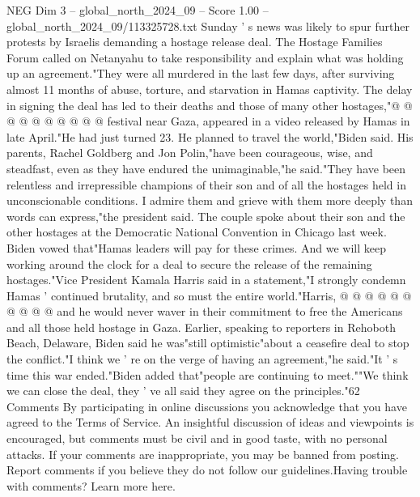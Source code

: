 \begin{textsample}{NEG Dim 3 – global\_north\_2024\_09 – Score 1.00 – global\_north\_2024\_09/113325728.txt}
Sunday ' s news was likely to spur further protests by Israelis demanding a hostage release deal.
The Hostage Families Forum called on Netanyahu to take responsibility and explain what was holding up an agreement."They were all murdered in the last few days, after surviving almost 11 months of abuse, torture, and starvation in Hamas captivity.
The delay in signing the deal has led to their deaths and those of many other hostages,"@ @ @ @ @ @ @ @ @ @ festival near Gaza, appeared in a video released by Hamas in late April."He had just turned 23.
He planned to travel the world,"Biden said.
His parents, Rachel Goldberg and Jon Polin,"have been courageous, wise, and steadfast, even as they have endured the unimaginable,"he said."They have been relentless and irrepressible champions of their son and of all the hostages held in unconscionable conditions.
I admire them and grieve with them more deeply than words can express,"the president said.
The couple spoke about their son and the other hostages at the Democratic National Convention in Chicago last week.
Biden vowed that"Hamas leaders will pay for these crimes.
And we will keep working around the clock for a deal to secure the release of the remaining hostages."Vice President Kamala Harris said in a statement,"I strongly condemn Hamas ' continued brutality, and so must the entire world."Harris, @ @ @ @ @ @ @ @ @ @ and he would never waver in their commitment to free the Americans and all those held hostage in Gaza.
Earlier, speaking to reporters in Rehoboth Beach, Delaware, Biden said he was"still optimistic"about a ceasefire deal to stop the conflict."I think we ' re on the verge of having an agreement,"he said."It ' s time this war ended."Biden added that"people are continuing to meet.""We think we can close the deal, they ' ve all said they agree on the principles."62 Comments By participating in online discussions you acknowledge that you have agreed to the Terms of Service.
An insightful discussion of ideas and viewpoints is encouraged, but comments must be civil and in good taste, with no personal attacks.
If your comments are inappropriate, you may be banned from posting.
Report comments if you believe they do not follow our guidelines.Having trouble with comments?
Learn more here.

\end{textsample}
